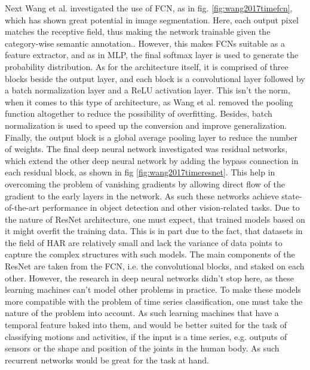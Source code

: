 Next Wang et al. investigated the use of FCN, as in fig. \ref{fig:wang2017timefcn}, which has shown great potential in image segmentation. Here, each output pixel matches the receptive field, thus making the network trainable given the category-wise semantic annotation.\cite{wang2017time}. However, this makes FCNs suitable as a feature extractor, and as in MLP, the final softmax layer is used to generate the probability distribution. As for the architecture itself, it is comprised of three blocks beside the output layer, and each block is a convolutional layer followed by a batch normalization layer and a ReLU activation layer. This isn't the norm, when it comes to this type of architecture, as Wang et al. removed the pooling function altogether to reduce the possibility of overfitting. Besides, batch normalization is used to speed up the conversion and improve generalization. Finally, the output block is a global average pooling layer to reduce the number of weights\cite{wang2017time}.\newline
The final deep neural network investigated was residual networks, which extend the other deep neural network by adding the bypass connection in each residual block, as shown in fig \ref{fig:wang2017timeresnet}. This help in overcoming the problem of vanishing gradients by allowing direct flow of the gradient to the early layers in the network. As such these networks achieve state-of-the-art performance in object detection and other vision-related tasks. Due to the nature of ResNet architecture, one must expect, that trained models based on it might overfit the training data. This is in part due to the fact, that datasets in the field of HAR are relatively small and lack the variance of data points to capture the complex structures with such models. The main components of the ResNet are taken from the FCN, i.e. the convolutional blocks, and staked on each other\cite{wang2017time}.\newline
However, the research in deep neural networks didn't stop here, as these learning machines can't model other problems in practice. To make these models more compatible with the problem of time series classification, one must take the nature of the problem into account. As such learning machines that have a temporal feature baked into them, and would be better suited for the task of classifying motions and activities, if the input is a time series, e.g. outputs of sensors or the shape and position of the joints in the human body. As such recurrent networks would be great for the task at hand.
